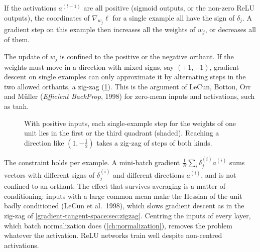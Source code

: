 \begin{notechapter}
\begin{proposition}\label{activation-functions:prop:orthant}
If the activations $a^{(l-1)}$ are all positive (sigmoid outputs, or the non-zero ReLU outputs),
the coordinates of $\nabla_{w_j}\ell$ for a single example all have the sign of $\delta_j$. A gradient step on
this example then increases all the weights of $w_j$, or decreases all of them.
\end{proposition}

The update of $w_j$ is confined to the positive or the negative orthant. If the weights must
move in a direction with mixed signs, say $(+1,-1)$, gradient descent on single examples can
only approximate it by alternating steps in the two allowed orthants, a zig-zag
(\cref{activation-functions:fig:orthant}). This is the argument of LeCun, Bottou, Orr and
Müller (\emph{Efficient BackProp}, 1998) for zero-mean inputs and activations, such as tanh.

\begin{figure}[ht]
\centering
{}
\caption{With positive inputs, each single-example step for the weights of one unit lies in
the first or the third quadrant (shaded). Reaching a direction like $(1,-\frac12)$ takes a
zig-zag of steps of both kinds.}
\label{activation-functions:fig:orthant}
\end{figure}

\begin{pitfall}
The constraint holds per example. A mini-batch gradient $\frac1B\sum_i\delta_j^{(i)}a^{(i)}$ sums vectors with
different signs of $\delta_j^{(i)}$ and different directions $a^{(i)}$, and is not confined to an orthant.
The effect that survives averaging is a matter of conditioning: inputs with a large common
mean make the Hessian of the unit badly conditioned (LeCun et al.\ 1998), which slows
gradient descent as in the zig-zag of \cref{gradient-tangent-space:sec:zigzag}. Centring
the inputs of every layer, which batch normalization does (\cref{ch:normalization}),
removes the problem whatever the activation. ReLU networks train well despite non-centred
activations.
\end{pitfall}


\end{notechapter}

